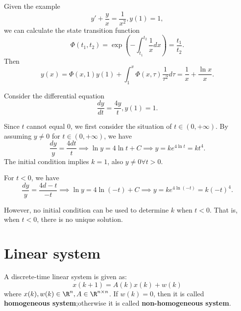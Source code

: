 \begin{refsection}
\begin{example}
Given the example
$$y' + \frac{y}{x} = \frac{1}{x^2},y(1)=1,$$
we can calculate the state transition function 
$$\Phi(t_1,t_2) = \exp(-\int_{t_1}^{t_2}\frac{1}{x}dx) = \frac{t_1}{t_2}.$$
Then
$$y(x) = \Phi(x,1)y(1) + \int_1^x \Phi(x,\tau)\frac{1}{\tau^2}d\tau = \frac{1}{x} + \frac{\ln x}{x}. $$
\end{example}


\begin{example}
Consider the differential equation 
$$\frac{dy}{dt} = \frac{4y}{t}, y(1) = 1.$$

Since $t$ cannot equal 0, we first consider the situation of $t \in (0,+\infty)$. By assuming $y\neq 0$ for $t\in (0,+\infty)$, we have
$$\frac{dy}{y} = \frac{4dt}{t} \implies \ln y = 4 \ln t + C \implies y = ke^{4\ln t}=kt^4.$$
The initial condition implies $k=1$, also $y\neq 0 \forall t > 0$.

For $t < 0$, we have
$$\frac{dy}{y} = \frac{4d-t}{-t} \implies \ln y = 4 \ln (-t) + C \implies y = ke^{4\ln (-t)}=k(-t)^4.$$

However, no initial condition can be used to determine $k$ when $t < 0$. That is, when $t<0$, there is no unique solution.

	
\end{example}


\section{Linear system}
\begin{definition}
A discrete-time linear system is given as:
$$x(k+1) = A(k)x(k) + w(k)$$
where $x(k),w(k) \in \R^n, A\in \R^{n\times n}$.
If $w(k) = 0$, then it is called \textbf{homogeneous system};otherwise it is called \textbf{non-homogeneous system}. 
\end{definition}




\end{refsection}
